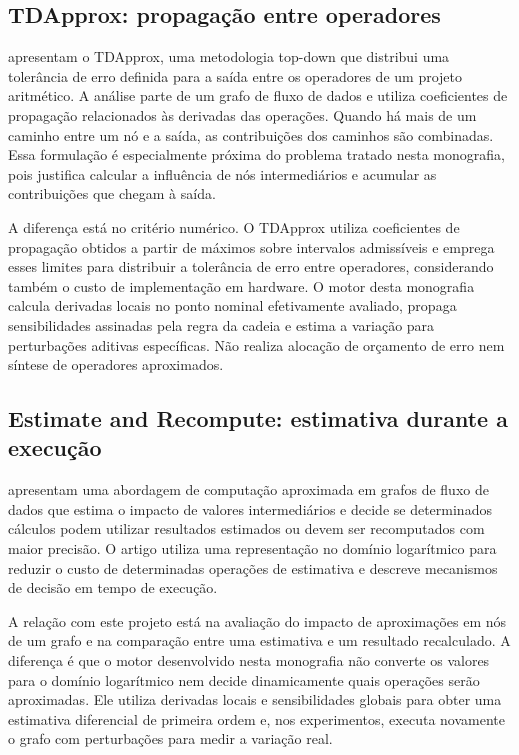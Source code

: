 \documentclass[12pt,openright,oneside,a4paper,brazil]{abntex2}
\begin{document}
\subsection{TDApprox: propagação entre operadores}
 apresentam o TDApprox, uma metodologia top-down que distribui uma tolerância de erro definida para a saída entre os operadores de um projeto aritmético. A análise parte de um grafo de fluxo de dados e utiliza coeficientes de propagação relacionados às derivadas das operações. Quando há mais de um caminho entre um nó e a saída, as contribuições dos caminhos são combinadas. Essa formulação é especialmente próxima do problema tratado nesta monografia, pois justifica calcular a influência de nós intermediários e acumular as contribuições que chegam à saída.

A diferença está no critério numérico. O TDApprox utiliza coeficientes de propagação obtidos a partir de máximos sobre intervalos admissíveis e emprega esses limites para distribuir a tolerância de erro entre operadores, considerando também o custo de implementação em hardware. O motor desta monografia calcula derivadas locais no ponto nominal efetivamente avaliado, propaga sensibilidades assinadas pela regra da cadeia e estima a variação para perturbações aditivas específicas. Não realiza alocação de orçamento de erro nem síntese de operadores aproximados.

\subsection{Estimate and Recompute: estimativa durante a execução}
 apresentam uma abordagem de computação aproximada em grafos de fluxo de dados que estima o impacto de valores intermediários e decide se determinados cálculos podem utilizar resultados estimados ou devem ser recomputados com maior precisão. O artigo utiliza uma representação no domínio logarítmico para reduzir o custo de determinadas operações de estimativa e descreve mecanismos de decisão em tempo de execução.

A relação com este projeto está na avaliação do impacto de aproximações em nós de um grafo e na comparação entre uma estimativa e um resultado recalculado. A diferença é que o motor desenvolvido nesta monografia não converte os valores para o domínio logarítmico nem decide dinamicamente quais operações serão aproximadas. Ele utiliza derivadas locais e sensibilidades globais para obter uma estimativa diferencial de primeira ordem e, nos experimentos, executa novamente o grafo com perturbações para medir a variação real.
\end{document}
